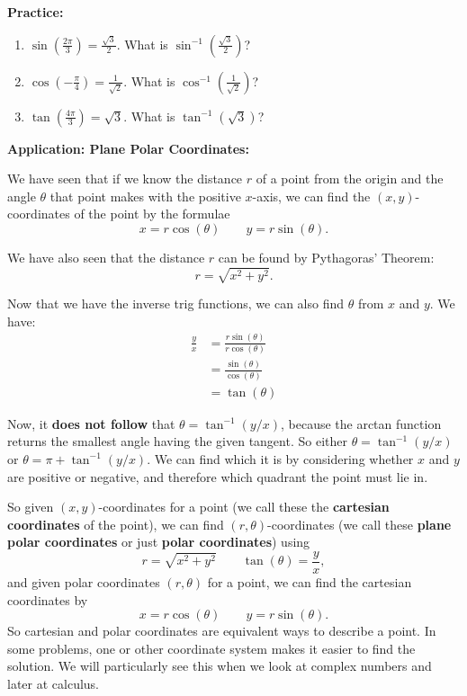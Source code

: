 \documentclass{article}
\begin{document}
\clearpage



\textbf{Practice:}

\vspace{5mm}

\begin{enumerate}
\item $\sin\left(\frac{2\pi}{3}\right)=\frac{\sqrt{3}}{2}$. What is $\sin^{-1}\left(\frac{\sqrt{3}}{2}\right)$?
\item $\cos\left(-\frac{\pi}{4}\right)=\frac{1}{\sqrt{2}}$. What is $\cos^{-1}\left(\frac{1}{\sqrt{2}}\right)$?
\item $\tan(\frac{4\pi}{3})=\sqrt{3}$. What is $\tan^{-1}(\sqrt{3})$?
\end{enumerate}


\clearpage

\textbf{Application: Plane Polar Coordinates:}

\vspace{5mm}

We have seen that if we know the distance $r$ of a point from the origin and the angle $\theta$ that point makes with the positive $x$-axis, we can find the $(x,y)$-coordinates of the point by the formulae
\[x=r\cos(\theta)\qquad y=r\sin(\theta).\]

We have also seen that the distance $r$ can be found by Pythagoras' Theorem:
\[r=\sqrt{x^2+y^2}.\]

Now that we have the inverse trig functions, we can also find $\theta$ from $x$ and $y$. We have:
\begin{align*}
\frac{y}{x}&=\frac{r\sin(\theta)}{r\cos(\theta)}\\
&= \frac{\sin(\theta)}{\cos(\theta)}\\
&=\tan(\theta)
\end{align*}

Now, it \textbf{does not follow} that $\theta=\tan^{-1}(y/x)$, because the arctan function returns the smallest angle having the given tangent. So either $\theta=\tan^{-1}(y/x)$ or $\theta=\pi+\tan^{-1}(y/x)$. We can find which it is by considering whether $x$ and $y$ are positive or negative, and therefore which quadrant the point must lie in.

So given $(x,y)$-coordinates for a point (we call these the \textbf{cartesian coordinates} of the point), we can find $(r,\theta)$-coordinates (we call these \textbf{plane polar coordinates} or just \textbf{polar coordinates}) using
\[r=\sqrt{x^2+y^2}\qquad \tan(\theta)=\frac{y}{x},\]
and given polar coordinates  $(r,\theta)$ for a point, we can find the cartesian coordinates by
\[x=r\cos(\theta)\qquad y=r\sin(\theta).\]
So cartesian and polar coordinates are equivalent ways to describe a point. In some problems, one or other coordinate system makes it easier to find the solution. We will particularly see this when we look at complex numbers and later at calculus.
\end{document}
